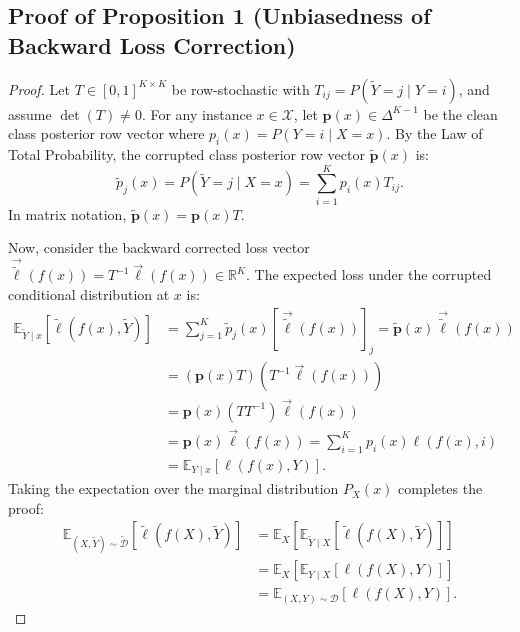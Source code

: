 \documentclass[journal]{IEEEtran}
\theoremstyle{definition}
\begin{document}
\subsection{Proof of Proposition 1 (Unbiasedness of Backward Loss Correction)}
\label{sec:proof_unbiasedness}
\begin{proof}
Let $T \in [0, 1]^{K \times K}$ be row-stochastic with $T_{ij} = P(\tilde{Y} = j \mid Y = i)$, and assume $\det(T) \ne 0$. For any instance $x \in \mathcal{X}$, let $\mathbf{p}(x) \in \Delta^{K-1}$ be the clean class posterior row vector where $p_i(x) = P(Y = i \mid X = x)$. By the Law of Total Probability, the corrupted class posterior row vector $\tilde{\mathbf{p}}(x)$ is:
\begin{equation}
\tilde{p}_j(x) = P(\tilde{Y} = j \mid X = x) = \sum_{i=1}^K p_i(x) T_{ij}.
\end{equation}
In matrix notation, $\tilde{\mathbf{p}}(x) = \mathbf{p}(x) T$.

Now, consider the backward corrected loss vector $\vec{\tilde{\ell}}(f(x)) = T^{-1} \vec{\ell}(f(x)) \in \mathbb{R}^K$. The expected loss under the corrupted conditional distribution at $x$ is:
\begin{align}
\mathbb{E}_{\tilde{Y} \mid x} [\tilde{\ell}(f(x), \tilde{Y})] &= \sum_{j=1}^K \tilde{p}_j(x) [\vec{\tilde{\ell}}(f(x))]_j = \tilde{\mathbf{p}}(x) \vec{\tilde{\ell}}(f(x)) \nonumber \\
&= (\mathbf{p}(x) T) (T^{-1} \vec{\ell}(f(x))) \nonumber \\
&= \mathbf{p}(x) (T T^{-1}) \vec{\ell}(f(x)) \nonumber \\
&= \mathbf{p}(x) \vec{\ell}(f(x)) = \sum_{i=1}^K p_i(x) \ell(f(x), i) \nonumber \\
&= \mathbb{E}_{Y \mid x} [\ell(f(x), Y)].
\end{align}
Taking the expectation over the marginal distribution $P_X(x)$ completes the proof:
\begin{align}
\mathbb{E}_{(X, \tilde{Y}) \sim \tilde{\mathcal{D}}} [\tilde{\ell}(f(X), \tilde{Y})] &= \mathbb{E}_X [\mathbb{E}_{\tilde{Y} \mid X} [\tilde{\ell}(f(X), \tilde{Y})]] \nonumber \\
&= \mathbb{E}_X [\mathbb{E}_{Y \mid X} [\ell(f(X), Y)]] \nonumber \\
&= \mathbb{E}_{(X, Y) \sim \mathcal{D}} [\ell(f(X), Y)].
\end{align}
\end{proof}
\end{document}
